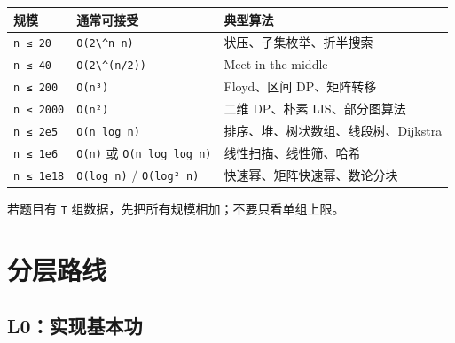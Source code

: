 \begin{longtable}[]{@{}
  >{\raggedright\arraybackslash}p{}
  >{\raggedright\arraybackslash}p{}
  >{\raggedright\arraybackslash}p{}@{}}
\toprule\noalign{}
\begin{minipage}[b]{\linewidth}\raggedright
规模
\end{minipage} & \begin{minipage}[b]{\linewidth}\raggedright
通常可接受
\end{minipage} & \begin{minipage}[b]{\linewidth}\raggedright
典型算法
\end{minipage} \\
\midrule\noalign{}
\endhead
\bottomrule\noalign{}
\endlastfoot
\passthrough{\lstinline!n ≤ 20!} & \passthrough{\lstinline!O(2\^n n)!} & 状压、子集枚举、折半搜索 \\
\passthrough{\lstinline!n ≤ 40!} & \passthrough{\lstinline!O(2\^(n/2))!} & Meet-in-the-middle \\
\passthrough{\lstinline!n ≤ 200!} & \passthrough{\lstinline!O(n³)!} & Floyd、区间 DP、矩阵转移 \\
\passthrough{\lstinline!n ≤ 2000!} & \passthrough{\lstinline!O(n²)!} & 二维 DP、朴素 LIS、部分图算法 \\
\passthrough{\lstinline!n ≤ 2e5!} & \passthrough{\lstinline!O(n log n)!} & 排序、堆、树状数组、线段树、Dijkstra \\
\passthrough{\lstinline!n ≤ 1e6!} & \passthrough{\lstinline!O(n)!} 或 \passthrough{\lstinline!O(n log log n)!} & 线性扫描、线性筛、哈希 \\
\passthrough{\lstinline!n ≤ 1e18!} & \passthrough{\lstinline!O(log n)!} / \passthrough{\lstinline!O(log² n)!} & 快速幂、矩阵快速幂、数论分块 \\
\end{longtable}

若题目有 \passthrough{\lstinline!T!} 组数据，先把所有规模相加；不要只看单组上限。

\section{分层路线}\label{ux5206ux5c42ux8defux7ebf}

\subsection{L0：实现基本功}\label{l0ux5b9eux73b0ux57faux672cux529f}

